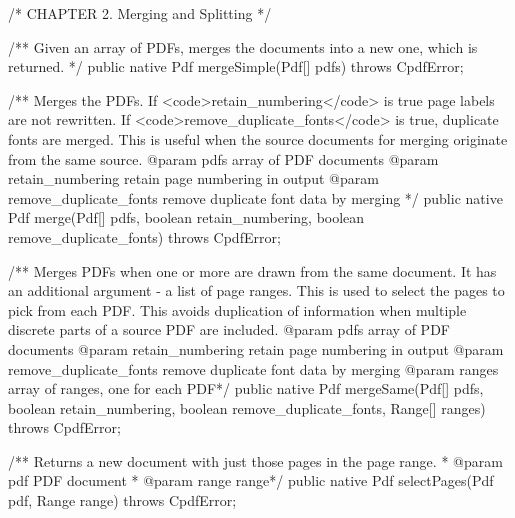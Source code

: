 /* CHAPTER 2. Merging and Splitting */

/** Given an array of PDFs, merges the documents into a new one, which is
returned. */
public native Pdf mergeSimple(Pdf[] pdfs) throws CpdfError;

/** Merges the PDFs. If <code>retain_numbering</code> is true page labels
are not rewritten. If <code>remove_duplicate_fonts</code> is true,
duplicate fonts are merged. This is useful when the source documents for
merging originate from the same source.
@param pdfs array of PDF documents
@param retain_numbering retain page numbering in output
@param remove_duplicate_fonts remove duplicate font data by merging */
public native Pdf merge(Pdf[] pdfs, boolean retain_numbering,
                        boolean remove_duplicate_fonts)
    throws CpdfError;

/** Merges PDFs when one or more are drawn from the same document. It has
an additional argument - a list of page ranges. This is used to select the
pages to pick from each PDF. This avoids duplication of information when
multiple discrete parts of a source PDF are included.
@param pdfs array of PDF documents
@param retain_numbering retain page numbering in output
@param remove_duplicate_fonts remove duplicate font data by merging
@param ranges array of ranges, one for each PDF*/
public native Pdf mergeSame(Pdf[] pdfs, boolean retain_numbering,
                            boolean remove_duplicate_fonts, Range[] ranges)
    throws CpdfError;

/** Returns a new document with just those pages in the page range.
 *  @param pdf PDF document
 *  @param range range*/
public native Pdf selectPages(Pdf pdf, Range range) throws CpdfError;
